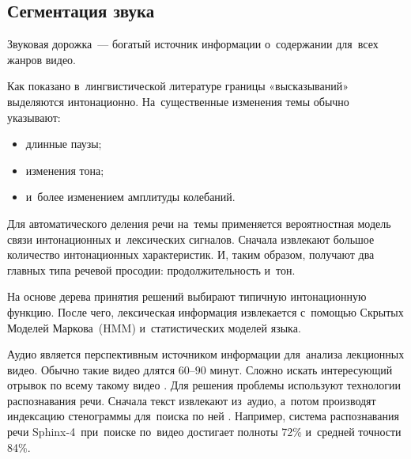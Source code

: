 \subsection{Сегментация звука}

Звуковая дорожка~— богатый источник информации
о~содержании для~всех жанров видео.

Как показано в~лингвистической литературе границы «высказываний»
выделяются интонационно.
На~существенные изменения темы обычно указывают:
\begin{itemize}
    \item длинные паузы;
    \item изменения тона;
    \item и~более изменением амплитуды колебаний.
\end{itemize}

Для автоматического деления речи на~темы
применяется вероятностная модель связи интонационных
и~лексических сигналов.
Сначала извлекают большое количество интонационных характеристик.
И, таким образом, получают два главных типа речевой просодии:
продолжительность и~тон.

На основе дерева принятия решений выбирают
типичную интонационную функцию.
После чего, лексическая информация извлекается
с~помощью Скрытых Моделей Маркова\
(HMM) и~статистических моделей языка.

Аудио является перспективным источником информации
для~анализа лекционных видео.
Обычно такие видео длятся $60 – 90$ минут.
Сложно искать интересующий отрывок по всему такому видео \cite{Repp:2008}.
Для решения проблемы используют технологии
распознавания речи.
Сначала текст извлекают из~аудио,
а~потом производят индексацию стенограммы для~поиска по ней \cite{Kumar:2011}.
Например, система распознавания речи Sphinx-4\index{Sphinx-4}\ при~поиске
по~видео достигает полноты 72\% и~средней точности 84\%.

